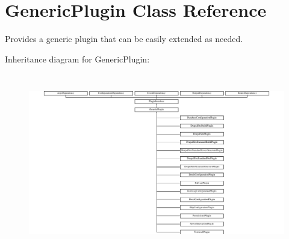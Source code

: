 \hypertarget{classGenericPlugin}{\section{Generic\-Plugin Class Reference}
\label{classGenericPlugin}
}


Provides a generic plugin that can be easily extended as needed.  


Inheritance diagram for Generic\-Plugin\-:\begin{figure}[H]
\begin{center}
\leavevmode
\includegraphics[height=7.875000cm]{classGenericPlugin}
\end{center}
\end{figure}
